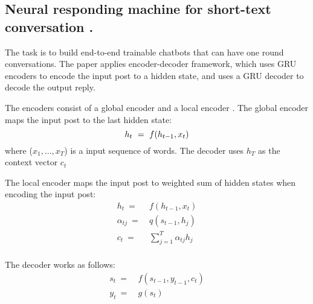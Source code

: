 \subsection{Neural responding machine for short-text conversation \cite{Shang2015Neural}.}

The task is to build end-to-end trainable chatbots that can have one round conversations. The paper applies encoder-decoder framework, which uses GRU \cite{Chung2014Empirical, Cho2014Learning} encoders to encode the input post to a hidden state, and uses a GRU decoder to decode the output reply.

The encoders consist of a global encoder \cite{Chung2014Empirical, Cho2014Learning} and a local encoder \cite{Bahdanau2014Neural, Graves2013Generating}. The global encoder maps the input post to the last hidden state:
\begin{equation}
h_{t} \ = \ f( h_{t-1}, x_{t} ) \\
\end{equation}
where ($x_{1},...,x_{T}$) is a input sequence of words. The decoder uses $h_{T}$ as the context vector $c_{t}$

The local encoder maps the input post to weighted sum of hidden states when encoding the input post:
\begin{equation}
\begin{aligned}
h_{t} \ =& \ f( h_{t-1}, x_{t} ) \\
\alpha_{tj} \ =& \ q(s_{t-1}, h_{j}) \\
c_{t} \ =& \ \sum_{j=1}^{T} \alpha_{tj}h_{j} \\
\end{aligned}
\end{equation}

The decoder works as follows:
\begin{equation}
\begin{aligned}
s_{t} \ =& \ f( s_{t-1}, y_{t-1}, c_{t} ) \\
y_{t} \ =& \ g( s_{t} ) \\
\end{aligned}
\end{equation}